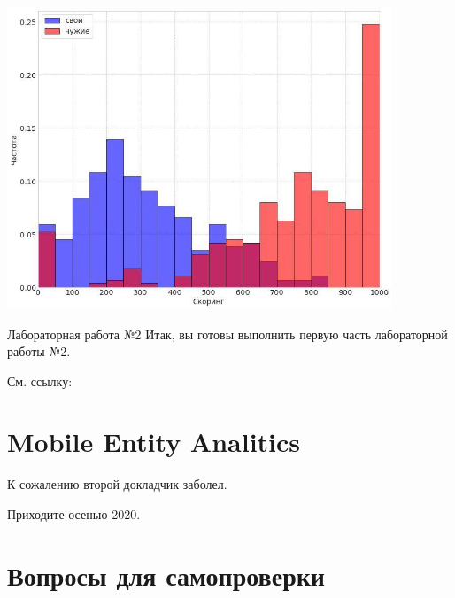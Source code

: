 \begin{frame}
	\includegraphics[width=11.5cm]{../pic/ueba_mta_example_reluslt.jpg}
\end{frame}

\begin{frame}{Лабораторная работа №2}
	Итак, вы готовы выполнить первую часть лабораторной работы №2.
	
	См. ссылку: 
	
\end{frame}


\section{Mobile Entity Analitics}\label{section:mea}

\begin{frame}
	К сожалению второй докладчик заболел.
	
	Приходите осенью 2020.
\end{frame}



\section{Вопросы для самопроверки}

